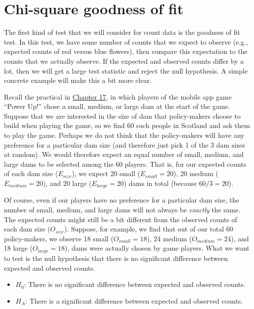 \documentclass[
  openany]{krantz}
\providecommand{\tightlist}{%
  \setlength{\itemsep}{0pt}\setlength{\parskip}{0pt}}
\begin{document}
\hypertarget{chi-square-goodness-of-fit}{%
\section{Chi-square goodness of fit}\label{chi-square-goodness-of-fit}}

The first kind of test that we will consider for count data is the goodness of fit test.
In this test, we have some number of counts that we expect to observe (e.g., expected counts of red versus blue flowers), then compare this expectation to the counts that we actually observe.
If the expected and observed counts differ by a lot, then we will get a large test statistic and reject the null hypothesis.
A simple concrete example will make this a bit more clear.

Recall the practical in \protect\hyperlink{Chapter_17}{Chapter 17}, in which players of the mobile app game ``Power Up!'' chose a small, medium, or large dam at the start of the game.
Suppose that we are interested in the size of dam that policy-makers choose to build when playing the game, so we find 60 such people in Scotland and ask them to play the game.
Perhaps we do not think that the policy-makers will have any preference for a particular dam size (and therefore just pick 1 of the 3 dam sizes at random).
We would therefore expect an equal number of small, medium, and large dams to be selected among the 60 players.
That is, for our expected counts of each dam size (\(E_{size}\)), we expect 20 small (\(E_{small} = 20\)), 20 medium (\(E_{medium} = 20\)), and 20 large (\(E_{large} = 20\)) dams in total (because \(60/3 = 20\)).

Of course, even if our players have no preference for a particular dam size, the number of small, medium, and large dams will not always be \emph{exactly} the same.
The expected counts might still be a bit different from the observed counts of each dam size (\(O_{size}\)).
Suppose, for example, we find that out of our total 60 policy-makers, we observe 18 small (\(O_{small} = 18\)), 24 medium (\(O_{medium} = 24\)), and 18 large (\(O_{large} = 18\)), dams were actually chosen by game players.
What we want to test is the null hypothesis that there is no significant difference between expected and observed counts.

\begin{itemize}
\tightlist
\item
  \(H_{0}\): There is no significant difference between expected and observed counts.
\item
  \(H_{A}\): There is a significant difference between expected and observed counts.
\end{itemize}
\end{document}
